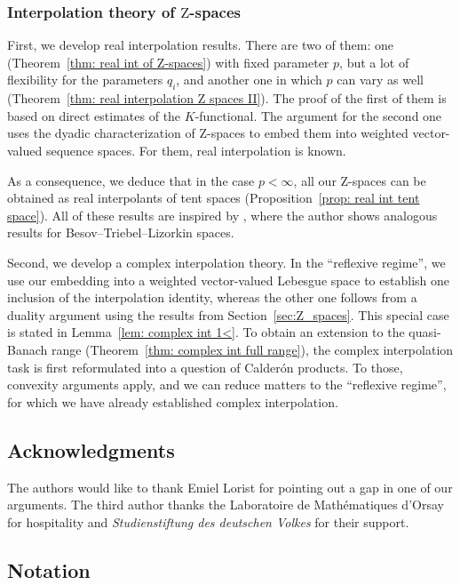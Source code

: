 \documentclass[11pt, leqno,parskip=half]{amsart}
\theoremstyle{definition}
\newcommand{\Z}{\mathrm{Z}}
\numberwithin{equation}{section}
\begin{document}
\subsubsection*{Interpolation theory of $\Z$-spaces}

First, we develop real interpolation results. There are two of them: one (Theorem~\ref{thm: real int of Z-spaces}) with fixed parameter $p$, but a lot of flexibility for the parameters $q_i$, and another one in which $p$ can vary as well (Theorem~\ref{thm: real interpolation Z spaces II}). The proof of the first of them is based on direct estimates of the $K$-functional. The argument for the second one uses the dyadic characterization of $\Z$-spaces to embed them into weighted vector-valued sequence spaces. For them, real interpolation is known.

As a consequence, we deduce that in the case $p < \infty$, all our $\Z$-spaces can be obtained as real interpolants of tent spaces (Proposition~\ref{prop: real int tent space}). All of these results are inspired by \cite[Thm.\@ 2.4.2]{Triebel1}, where the author shows analogous results for Besov--Triebel--Lizorkin spaces.

Second, we develop a complex interpolation theory. In the \enquote{reflexive regime}, we use our embedding into a weighted vector-valued Lebesgue space to establish one inclusion of the interpolation identity, whereas the other one follows from a duality argument using the results from Section~\ref{sec:Z_spaces}.
This special case is stated in Lemma~\ref{lem: complex int 1<}.
To obtain an extension to the quasi-Banach range (Theorem~\ref{thm: complex int full range}), the complex interpolation task is first reformulated into a question of Calder\'{o}n products. To those, convexity arguments apply, and we can reduce matters to the \enquote{reflexive regime}, for which we have already established complex interpolation.



\subsection{Acknowledgments}
The authors would like to thank Emiel Lorist for pointing out a gap in one of our arguments. The third author thanks the Laboratoire de Mathématiques d’Orsay for hospitality and \textit{Studienstiftung des deutschen Volkes} for their support.






\subsection{Notation}
\label{sec: notation}
\end{document}
